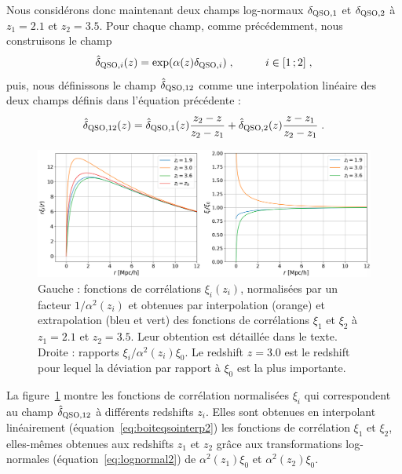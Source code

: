 \documentclass[11pt, twoside, a4paper, openright]{report}
\begin{document}
Nous considérons donc maintenant deux champs log-normaux $\delta_{\textsc{QSO},1}$ et $\delta_{\textsc{QSO},2}$ à $z_1 = \num{2.1}$ et $z_2 = \num{3.5}$. Pour chaque champ, comme précédemment, nous construisons le champ
\begin{equation}
  \label{eq:boiteqsointerp1}
  \hat  \delta_{\textsc{QSO}, i}(z) = \exp(\alpha(z) \delta_{\textsc{QSO},i}) \; ,
  \hspace{1cm} i \in [1\, ; 2] \; ,
\end{equation}
puis, nous définissons le champ $\hat \delta_{\textsc{QSO}, 12}$ comme une interpolation linéaire des deux champs définis dans l'équation précédente :
\begin{equation}
  \label{eq:boiteqsointerp2}
  \hat \delta_{\textsc{QSO}, 12}(z) = \hat \delta_{\textsc{QSO}, 1}(z) \frac{z_2 - z}{z_2 - z_1} + \hat \delta_{\textsc{QSO}, 2}(z) \frac{z - z_1}{z_2 - z_1} \; .
\end{equation}
\begin{figure}
  \centering
  \includegraphics[scale=0.4]{qsolognormal2}
  \caption{Gauche : fonctions de corrélations $\xi_{i}(z_i)$, normalisées par un facteur $1 / \alpha^2(z_i)$ et obtenues par interpolation (orange) et extrapolation (bleu et vert) des fonctions de corrélations $\xi_1$ et $\xi_2$ à $z_1 = \num{2.1}$ et $z_2 = \num{3.5}$. Leur obtention est détaillée dans le texte. Droite : rapports $\xi_i / \alpha^2(z_i) \xi_0$. Le redshift $z = \num{3.0}$ est le redshift pour lequel la déviation par rapport à $\xi_0$ est la plus importante.}
  \label{fig:qsolognormal2}
\end{figure}
La figure~\ref{fig:qsolognormal2} montre les fonctions de corrélation normalisées $\xi_i$ qui correspondent au champ $\hat \delta_{\textsc{QSO},12}$ à différents redshifts $z_i$. Elles sont obtenues en interpolant linéairement (équation~\ref{eq:boiteqsointerp2}) les fonctions de corrélation $\xi_1$ et $\xi_2$, elles-mêmes obtenues aux redshifts $z_1$ et $z_2$ grâce aux transformations log-normales (équation~\ref{eq:lognormal2}) de $\alpha^2(z_1)\xi_0$ et $\alpha^2(z_2)\xi_0$.
\end{document}
